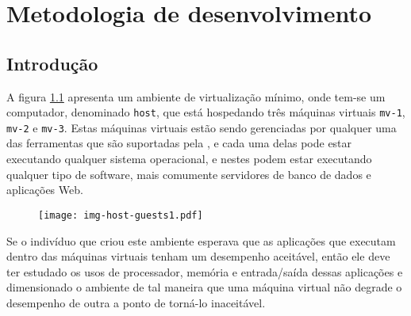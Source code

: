 %
%
%
% 
%
%

\chapter{Metodologia de desenvolvimento}\label{sec:meto}

\section{Introdução}


A figura \ref{fig:hostguests1} apresenta um ambiente de virtualização
mínimo, onde tem-se um computador, denominado \texttt{host}, que está
hospedando três máquinas virtuais \texttt{mv-1}, \texttt{mv-2} e
\texttt{mv-3}. Estas máquinas virtuais estão sendo gerenciadas por qualquer
uma das ferramentas que são suportadas pela \libvirt{}, e cada uma delas
pode estar executando qualquer sistema operacional, e nestes podem estar
executando qualquer tipo de software, mais comumente servidores de banco de
dados e aplicações Web.

\begin{figure}[htp]
\centering
\texttt{[image: img-host-guests1.pdf]}
\label{fig:hostguests1}
\end{figure}

Se o indivíduo que criou este ambiente esperava que as aplicações que
executam dentro das máquinas virtuais tenham um desempenho aceitável,
então ele deve ter estudado os usos de processador, memória e entrada/saída
dessas aplicações e dimensionado o ambiente de tal maneira que uma máquina
virtual não degrade o desempenho de outra a ponto de torná-lo inaceitável.

